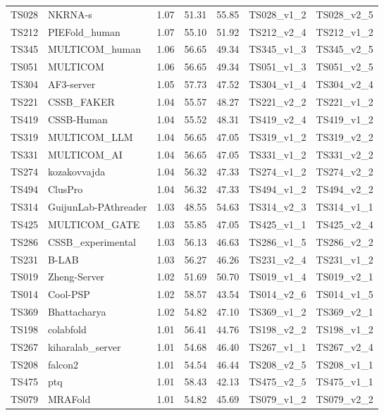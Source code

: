 \begin{table}[ht]
{\begin{tabular}{llrrrll}
TS028 & NKRNA-s & 1.07 & 51.31 & 55.85 & TS028\_v1\_2 & TS028\_v2\_5 \\ 
TS212 & PIEFold\_human & 1.07 & 55.10 & 51.92 & TS212\_v2\_4 & TS212\_v1\_2 \\ 
TS345 & MULTICOM\_human & 1.06 & 56.65 & 49.34 & TS345\_v1\_3 & TS345\_v2\_5 \\ 
TS051 & MULTICOM & 1.06 & 56.65 & 49.34 & TS051\_v1\_3 & TS051\_v2\_5 \\ 
TS304 & AF3-server & 1.05 & 57.73 & 47.52 & TS304\_v1\_4 & TS304\_v2\_4 \\ 
TS221 & CSSB\_FAKER & 1.04 & 55.57 & 48.27 & TS221\_v2\_2 & TS221\_v1\_2 \\ 
TS419 & CSSB-Human & 1.04 & 55.52 & 48.31 & TS419\_v2\_4 & TS419\_v1\_2 \\ 
TS319 & MULTICOM\_LLM & 1.04 & 56.65 & 47.05 & TS319\_v1\_2 & TS319\_v2\_2 \\ 
TS331 & MULTICOM\_AI & 1.04 & 56.65 & 47.05 & TS331\_v1\_2 & TS331\_v2\_2 \\ 
TS274 & kozakovvajda & 1.04 & 56.32 & 47.33 & TS274\_v1\_2 & TS274\_v2\_2 \\ 
TS494 & ClusPro & 1.04 & 56.32 & 47.33 & TS494\_v1\_2 & TS494\_v2\_2 \\ 
TS314 & GuijunLab-PAthreader & 1.03 & 48.55 & 54.63 & TS314\_v2\_3 & TS314\_v1\_1 \\ 
TS425 & MULTICOM\_GATE & 1.03 & 55.85 & 47.05 & TS425\_v1\_1 & TS425\_v2\_4 \\ 
TS286 & CSSB\_experimental & 1.03 & 56.13 & 46.63 & TS286\_v1\_5 & TS286\_v2\_2 \\ 
TS231 & B-LAB & 1.03 & 56.27 & 46.26 & TS231\_v2\_4 & TS231\_v1\_2 \\ 
TS019 & Zheng-Server & 1.02 & 51.69 & 50.70 & TS019\_v1\_4 & TS019\_v2\_1 \\ 
TS014 & Cool-PSP & 1.02 & 58.57 & 43.54 & TS014\_v2\_6 & TS014\_v1\_5 \\ 
TS369 & Bhattacharya & 1.02 & 54.82 & 47.10 & TS369\_v1\_2 & TS369\_v2\_1 \\ 
TS198 & colabfold & 1.01 & 56.41 & 44.76 & TS198\_v2\_2 & TS198\_v1\_2 \\ 
TS267 & kiharalab\_server & 1.01 & 54.68 & 46.40 & TS267\_v1\_1 & TS267\_v2\_4 \\ 
TS208 & falcon2 & 1.01 & 54.54 & 46.44 & TS208\_v2\_5 & TS208\_v1\_1 \\ 
TS475 & ptq & 1.01 & 58.43 & 42.13 & TS475\_v2\_5 & TS475\_v1\_1 \\ 
TS079 & MRAFold & 1.01 & 54.82 & 45.69 & TS079\_v1\_2 & TS079\_v2\_2 \\ 

\end{tabular}}
\end{table}
